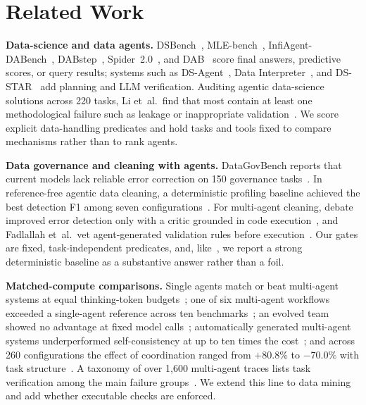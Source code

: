 \documentclass[conference]{IEEEtran}
\begin{document}
\section{Related Work}
\label{sec:related}
\textbf{Data-science and data agents.}
DSBench~\cite{jing2025dsbench}, MLE-bench~\cite{chan2025mlebench}, InfiAgent-DABench~\cite{hu2024infiagent},
DABstep~\cite{egg2025dabstep}, Spider~2.0~\cite{lei2025spider2}, and DAB~\cite{ma2026dab} score final answers,
predictive scores, or query results; systems such as DS-Agent~\cite{guo2024dsagent}, Data
Interpreter~\cite{hong2024datainterpreter}, and DS-STAR~\cite{nam2025dsstar} add planning and LLM verification.
Auditing agentic data-science solutions across 220 tasks, Li et~al.\ find that most contain at least one
methodological failure such as leakage or inappropriate validation~\cite{li2026silent}. We score explicit
data-handling predicates and hold tasks and tools fixed to compare mechanisms rather than to rank agents.

\textbf{Data governance and cleaning with agents.}
DataGovBench reports that current models lack reliable error correction on 150 governance
tasks~\cite{liu2025datagovbench}. In reference-free agentic data cleaning, a deterministic profiling baseline achieved
the best detection F1 among seven configurations~\cite{fadlallah2026cleaning}. For multi-agent cleaning, debate
improved error detection only with a critic grounded in code execution~\cite{parmar2026debate}, and Fadlallah
et~al.\ vet agent-generated validation rules before execution~\cite{fadlallah2026dqa}. Our gates are fixed,
task-independent predicates, and, like~\cite{fadlallah2026cleaning}, we report a strong deterministic baseline as a
substantive answer rather than a foil.

\textbf{Matched-compute comparisons.}
Single agents match or beat multi-agent systems at equal thinking-token budgets~\cite{tran2026single}; one of six
multi-agent workflows exceeded a single-agent reference across ten benchmarks~\cite{fu2026moreagents}; an evolved
team showed no advantage at fixed model calls~\cite{dylan2026equalcost}; automatically generated multi-agent systems
underperformed self-consistency at up to ten times the cost~\cite{jwalapuram2026illusion}; and across 260
configurations the effect of coordination ranged from $+80.8\%$ to $-70.0\%$ with task structure~\cite{kim2025scaling}.
A taxonomy of over 1,600 multi-agent traces lists task verification among the main failure
groups~\cite{cemri2025mas}. We extend this line to data mining and add whether executable checks are enforced.
\end{document}
